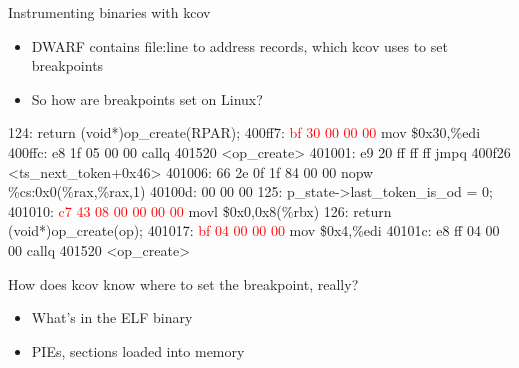 \documentclass{beamer}
\begin{document}
\begin{frame}[fragile]{Instrumenting binaries with kcov}
  \begin{itemize}
    \item DWARF contains file:line to address records, which kcov uses to set breakpoints
    \item<3-> So how are breakpoints set on Linux?
  \end{itemize}
  \begin{Example}
    \begin{semiverbatim}
      \scriptsize
 124:     return (void*)op\_create(RPAR);
400ff7:       \textcolor<2>{red}{bf 30 00 00 00}          mov    \$0x30,\%edi
400ffc:       e8 1f 05 00 00          callq  401520 <op\_create>
401001:       e9 20 ff ff ff          jmpq   400f26 <ts\_next\_token+0x46>
401006:       66 2e 0f 1f 84 00 00    nopw   \%cs:0x0(\%rax,\%rax,1)
40100d:       00 00 00
 125: p\_state->last\_token\_is\_od = 0;
401010:       \textcolor<2>{red}{c7 43 08 00 00 00 00}    movl   \$0x0,0x8(\%rbx)
 126: return (void*)op\_create(op);
401017:       \textcolor<2>{red}{bf 04 00 00 00}          mov    \$0x4,\%edi
40101c:       e8 ff 04 00 00          callq  401520 <op\_create>
   \end{semiverbatim}
   \end{Example}
\end{frame}

\begin{frame}[fragile]{How does kcov know where to set the breakpoint, really?}

  \note{
  }
  \begin{itemize}
  \item What's in the ELF binary
  \item PIEs, sections loaded into memory
  \end{itemize}
\end{frame}
\end{document}
